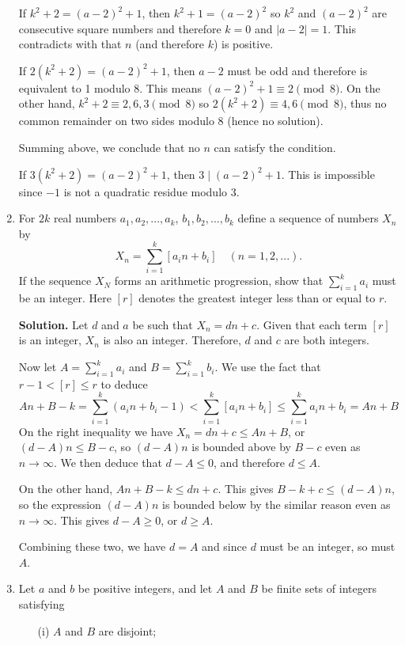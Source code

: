\documentclass[11pt,a4paper]{article}
\begin{document}
\begin{enumerate}
	If $k^2+2=(a-2)^2+1$, then $k^2+1=(a-2)^2$ so $k^2$ and $(a-2)^2$ are consecutive square numbers and therefore $k=0$ and $|a-2|=1$. This contradicts with that $n$ (and therefore $k$) is positive. 
	
	If $2(k^2+2)=(a-2)^2+1$, then $a-2$ must be odd and therefore is equivalent to 1 modulo 8. This means $(a-2)^2+1\equiv 2\pmod{8}$. On the other hand, $k^2+2\equiv 2, 6, 3\pmod{8}$ so $2(k^2+2)\equiv 4, 6\pmod{8}$, thus no common remainder on two sides modulo 8 (hence no solution). 
	
	Summing above, we conclude that no $n$ can satisfy the condition. 
	
	If $3(k^2+2)=(a-2)^2+1$, then $3\mid (a-2)^2+1$. This is impossible since $-1$ is not a quadratic residue modulo 3. 
	
	\item For $2k$ real numbers $a_1, a_2, ..., a_k$, $b_1, b_2, ..., b_k$ define a sequence of numbers $X_n$ by \[
	X_n = \sum_{i=1}^k [a_in + b_i] \quad (n=1,2,...).
	\] If the sequence $X_N$ forms an arithmetic progression, show that $\textstyle\sum_{i=1}^k a_i$ must be an integer. Here $[r]$ denotes the greatest integer less than or equal to $r$.
	
	\textbf{Solution.} Let $d$ and $a$ be such that $X_n=dn+c$. Given that each term $[r]$ is an integer, $X_n$ is also an integer. Therefore, $d$ and $c$ are both integers. 
	
	Now let $A=\textstyle\sum_{i=1}^k a_i$ and $B=\textstyle\sum_{i=1}^k b_i$. We use the fact that $r-1<[r]\le r$ to deduce 
	\[
	An+B-k = \sum_{i=1}^k (a_in + b_i - 1) < \sum_{i=1}^k [a_in + b_i]\le \sum_{i=1}^k a_in + b_i = An+B
	\]
	On the right inequality we have $X_n=dn+c\le An+B$, or $(d-A)n\le B-c$, so $(d-A)n$ is bounded above by $B-c$ even as $n\to\infty$. We then deduce that $d-A\le 0$, and therefore $d\le A$. 
	
	On the other hand, $An+B-k\le dn+c$. This gives $B-k+c\le (d-A)n$, so the expression $(d-A)n$ is bounded below by the similar reason even as $n\to\infty$. This gives $d-A\ge 0$, or $d\ge A$. 
	
	Combining these two, we have $d=A$ and since $d$ must be an integer, so must $A$. 
	
	\item Let $a$ and $b$ be positive integers, and let $A$ and $B$ be finite sets of integers satisfying
	\begin{itemize}
		\item [(i)] $A$ and $B$ are disjoint;
		

\end{itemize}
\end{enumerate}
\end{document}
